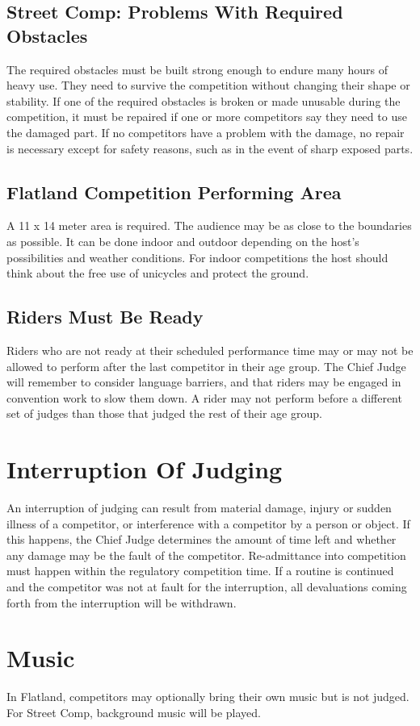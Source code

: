 \subsection{Street Comp: Problems With Required Obstacles}
The required obstacles must be built strong enough to endure many hours of heavy use. They need to survive the competition without changing their shape or stability. If one of the required obstacles is broken or made unusable during the competition, it must be repaired if one or more competitors say they need to use the damaged part. If no competitors have a problem with the damage, no repair is necessary except for safety reasons, such as in the event of sharp exposed parts. 
\subsection{Flatland Competition Performing Area}
A 11 x 14 meter area is required. The audience may be as close to the boundaries as possible. It can be done indoor and outdoor depending on the host's possibilities and weather conditions. For indoor competitions the host should think about the free use of unicycles and protect the ground. 
\subsection{Riders Must Be Ready}
Riders who are not ready at their scheduled performance time may or may not be allowed to perform after the last competitor in their age group. The Chief Judge will remember to consider language barriers, and that riders may be engaged in convention work to slow them down. A rider may not perform before a different set of judges than those that judged the rest of their age group.
\section{Interruption Of Judging}
An interruption of judging can result from material damage, injury or sudden illness of a competitor, or interference with a competitor by a person or object. If this happens, the Chief Judge determines the amount of time left and whether any damage may be the fault of the competitor. Re-admittance into competition must happen within the regulatory competition time. If a routine is continued and the competitor was not at fault for the interruption, all devaluations coming forth from the interruption will be withdrawn.
\section{Music}
In Flatland, competitors may optionally bring their own music but is not judged. For Street Comp, background music will be played.
